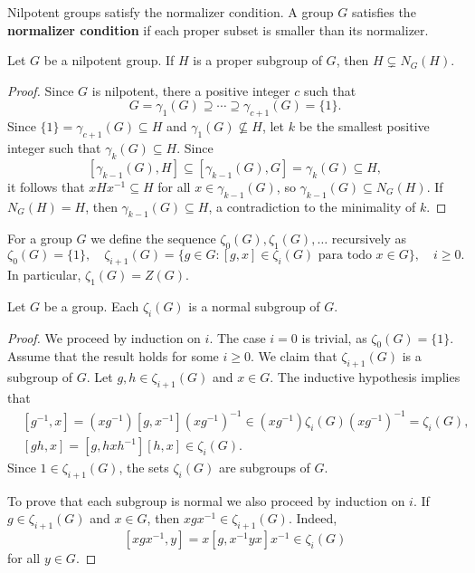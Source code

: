 Nilpotent groups satisfy the normalizer condition. A group 
$G$ satisfies the \textbf{normalizer condition} if each proper subset is smaller 
than its normalizer. 

\begin{lemma}
	\label{lem:normalizer}
	Let $G$ be a nilpotent group. If $H$ is a proper subgroup of $G$, then 
	$H\subsetneq N_G(H)$.
\end{lemma}

\begin{proof}
	Since $G$ is nilpotent, there a positive integer $c$ such that 
	\[
	G=\gamma_1(G)\supseteq\cdots\supseteq\gamma_{c+1}(G)=\{1\}.
	\]
	Since 
	$\{1\}=\gamma_{c+1}(G)\subseteq H$ and $\gamma_1(G)\not\subseteq H$, 
	let $k$ be the smallest positive integer such that $\gamma_k(G)\subseteq H$. Since 
	\[
		[\gamma_{k-1}(G),H]\subseteq [\gamma_{k-1}(G),G]=\gamma_k(G)\subseteq H,
	\]
	it follows that 
	$xHx^{-1}\subseteq H$ for all $x\in\gamma_{k-1}(G)$,
	so  $\gamma_{k-1}(G)\subseteq N_G(H)$. If $N_G(H)=H$, then 
	$\gamma_{k-1}(G)\subseteq H$, a contradiction to the minimality of $k$. 
\end{proof}



For a group $G$ we define the sequence $\zeta_0(G),\zeta_1(G),\dots$
recursively as 
\[
	\zeta_0(G)=\{1\},\quad
	\zeta_{i+1}(G)=\{g\in G:[g,x]\in\zeta_{i}(G)\text{ para todo $x\in G$}\},\quad i\geq 0.
\]
In particular, $\zeta_1(G)=Z(G)$.

\begin{lemma}
	\label{lem:central_ascendente}
	Let $G$ be a group. Each $\zeta_i(G)$ is a normal
	subgroup of $G$. 
\end{lemma}

\begin{proof}
	We proceed by induction on $i$. The case $i=0$ is trivial, as 
	$\zeta_0(G)=\{1\}$.  Assume that the result holds for some $i\geq0$.
	We claim that $\zeta_{i+1}(G)$ is a subgroup of $G$. 
	Let $g,h\in \zeta_{i+1}(G)$ and $x\in G$. The inductive hypothesis implies that 
	\begin{align*}
	&[g^{-1},x]=(xg^{-1})[g,x^{-1}](xg^{-1})^{-1}\in (xg^{-1})\zeta_i(G)(xg^{-1})^{-1}=\zeta_i(G),\\
	&[gh,x]=[g,hxh^{-1}][h,x]\in \zeta_{i}(G).
	\end{align*}
	Since $1\in\zeta_{i+1}(G)$, the sets $\zeta_i(G)$ are subgroups of $G$. 
	
	To prove 
	that each subgroup is normal we also proceed by induction on $i$. 
	If $g\in\zeta_{i+1}(G)$ and $x\in G$, then $xgx^{-1}\in\zeta_{i+1}(G)$. Indeed,  
	\[
	[xgx^{-1},y]=x[g,x^{-1}yx]x^{-1}\in\zeta_{i}(G)
	\]
	for all $y\in G$.
\end{proof}


